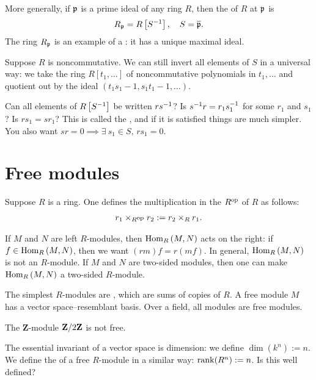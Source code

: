 \documentclass[11pt, oneside,margin=1in]{article}
\begin{document}
More generally, if $\mathfrak p$ is a prime ideal of any ring $R$, then the  of $R$ at $\mathfrak p$ is
$$
R_{\mathfrak p} = R\left[ S^{-1}\right], \quad S = \overline {\mathfrak p}.
$$
The ring $R_{\mathfrak p} $ is an example of a : it has a unique maximal ideal.

Suppose $R$ is noncommutative. We can still invert all elements of $S$ in a universal way: we take the ring $R[t_1,\hdots]$ of noncommutative polynomials in $t_1,\hdots$ and quotient out by the ideal $(t_1s_1 - 1, s_1t_1 -1,\hdots)$. 

Can all elements of $R\left[S^{-1}\right]$ be written $rs^{-1}$? Is $s^{-1} r = r_1s_1^{-1}$ for some $r_1$ and $s_1$? Is $rs_1 =sr_1$? This is called the , and if it is satisfied things are much simpler. You also want $sr=0\implies \exists\: s_1 \in S,\, rs_1=0$.

\section{Free modules}
Suppose $R$ is a ring. One defines the multiplication in the  $R\textsuperscript{op}$ of $R$ as follows:
\begin{align*}
	r_1 \times_{R\textsuperscript{op}} r_2 := r_2 \times_R r_1.
\end{align*}

If $M$ and $N$ are left $R$-modules, then $\operatorname{Hom}_R\left( M,N \right) $ acts on the right: if $f\in\operatorname{Hom}_R\left( M,N \right)$, then we want $\left( rm \right) f=r\left( mf \right) $. In general, $\operatorname{Hom}_R\left( M,N \right) $ is not an $R$-module. If $M$ and $N$ are two-sided modules, then one can make $\operatorname{Hom}_R\left( M,N \right) $ a two-sided $R$-module. 

The simplest $R$-modules are , which are sums of copies of $R$. A free module $M$ has a vector space--resemblant basis. Over a field, all modules are free modules. 
\begin{example}\label{}
The $\mathbf{Z}$-module $\mathbf Z / 2\mathbf Z$ is not free.
\end{example}

The essential invariant of a vector space is dimension: we define $\dim(k^n):= n$. We define the  of a free $R$-module in a similar way: $\operatorname{rank} (R^n):= n$. Is this well defined?
\end{document}
